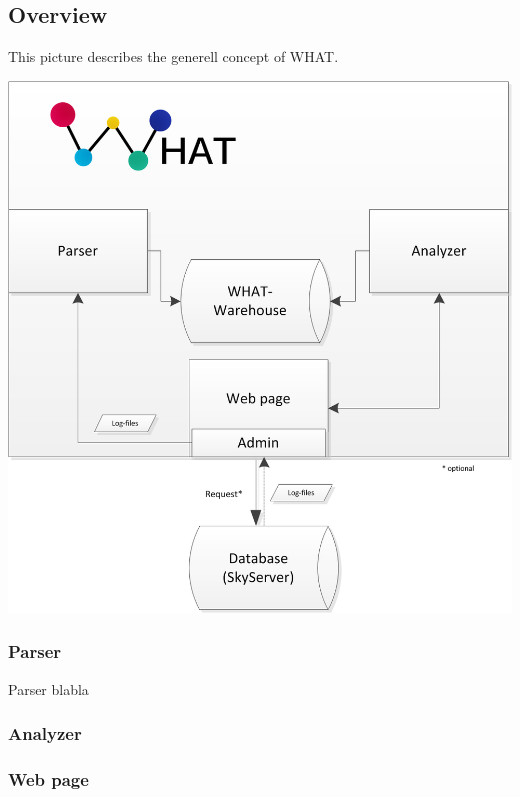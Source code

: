 \subsection{Overview}\label{overview}
This picture describes the generell concept of WHAT.
\begin{center}
\includegraphics[width=1\linewidth]{Pictures/GenerellConcept.png}
\end{center} 

\subsubsection{Parser}
Parser blabla
\subsubsection{Analyzer}
\subsubsection{Web page}

